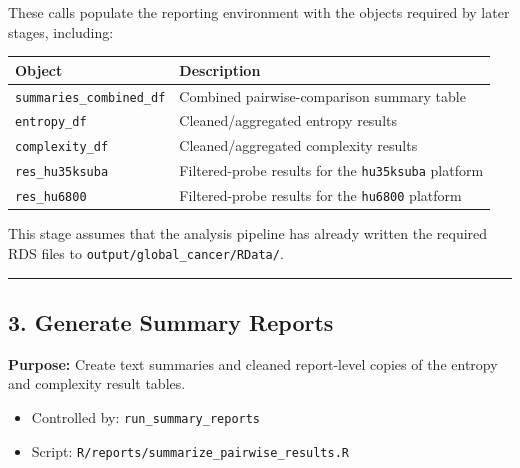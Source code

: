 \documentclass[
  letterpaper,
  DIV=11,
  numbers=noendperiod,
  openany,
  oneside]{scrreprt}
\providecommand{\tightlist}{%
  \setlength{\itemsep}{0pt}\setlength{\parskip}{0pt}}
\begin{document}
These calls populate the reporting environment with the objects required
by later stages, including:

\begin{longtable}[]{@{}
  >{\raggedright\arraybackslash}p{}
  >{\raggedright\arraybackslash}p{}@{}}
\toprule\noalign{}
\begin{minipage}[b]{\linewidth}\raggedright
Object
\end{minipage} & \begin{minipage}[b]{\linewidth}\raggedright
Description
\end{minipage} \\
\midrule\noalign{}
\endhead
\bottomrule\noalign{}
\endlastfoot
\texttt{summaries\_combined\_df} & Combined pairwise-comparison summary
table \\
\texttt{entropy\_df} & Cleaned/aggregated entropy results \\
\texttt{complexity\_df} & Cleaned/aggregated complexity results \\
\texttt{res\_hu35ksuba} & Filtered-probe results for the
\texttt{hu35ksuba} platform \\
\texttt{res\_hu6800} & Filtered-probe results for the \texttt{hu6800}
platform \\
\end{longtable}

This stage assumes that the analysis pipeline has already written the
required RDS files to \texttt{output/global\_cancer/RData/}.

\begin{center}\rule{0.5\linewidth}{0.5pt}\end{center}

\subsection*{3. Generate Summary
Reports}\label{generate-summary-reports}

\textbf{Purpose:} Create text summaries and cleaned report-level copies
of the entropy and complexity result tables.

\begin{itemize}
\tightlist
\item
  Controlled by: \texttt{run\_summary\_reports}
\item
  Script: \texttt{R/reports/summarize\_pairwise\_results.R}
\end{itemize}
\end{document}
